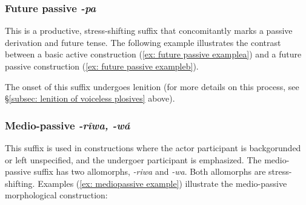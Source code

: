 \subsubsection{Future passive \textit{-pa}}
\label{subsubsec: future passive}

This is a productive, stress-shifting suffix that concomitantly marks a passive derivation and future tense. The following example illustrates the contrast between a basic active construction (\ref{ex: future passive examplea}) and a future passive construction (\ref{ex: future passive exampleb}).

\ea\label{ex: future passive example}

    \label{ex: future passive examplea}
        \label{ex: future passive exampleb}
    \z
\z

The onset of this suffix undergoes lenition (for more details on this process, see §\ref{subsec: lenition of voiceless plosives} above).

\subsubsection{Medio-passive \textit{-rîwa, -wá}}
\label{subsubsec: medio-passive}

This suffix is used in constructions where the actor participant is backgorunded or left unspecified, and the undergoer participant is emphasized. The medio-passive suffix has two allomorphs, \textit{-riwa} and \textit{-wa}. Both allomorphs are stress-shifting. Examples (\ref{ex: mediopassive example}) illustrate the medio-passive morphological construction:

